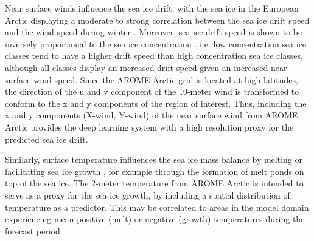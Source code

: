 \documentclass[../main/thesis.tex]{subfiles}
\begin{document}
Near surface winds influence the sea ice drift, with the sea ice in the European Arctic displaying a moderate to strong correlation between the sea ice drift speed and the wind speed during winter \citep{Spreen2011}. Moreover, sea ice drift speed is shown to be inversely proportional to the sea ice concentration \citep{Yu2020}. i.e. low concentration sea ice classes tend to have a higher drift speed than high concentration sea ice classes, although all classes display an increased drift speed given an increased near surface wind speed. Since the AROME Arctic grid is located at high latitudes, the direction of the u and v component of the 10-meter wind is transformed to conform to the x and y components of the region of interest.
Thus, including the x and y components (X-wind, Y-wind) of the near surface wind from AROME Arctic provides the deep learning system with a high resolution proxy for the predicted sea ice drift. 

Similarly, surface temperature influences the sea ice mass balance by melting or facilitating sea ice growth \citep{Hibler1979}, for example through the formation of melt ponds on top of the sea ice. The 2-meter temperature from AROME Arctic is intended to serve as a proxy for the sea ice growth, by including a spatial distribution of temperature as a predictor. This may be correlated to areas in the model domain experiencing mean positive (melt) or negative (growth) temperatures during the forecast period.
\end{document}
